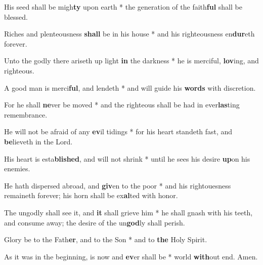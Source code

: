 \begin{multicols}{2}
	His seed shall be migh\textbf{ty} upon earth * the generation of the faith\textbf{ful} shall be blessed.
	
	Riches and plenteousness \textbf{shall} be in his house * and his righteousness en\textbf{dur}eth forever.
	
	Unto the godly there ariseth up light \textbf{in} the darkness * he is merciful, \textbf{lov}ing, and righteous.
	
	A good man is merci\textbf{ful}, and lendeth * and will guide his \textbf{words} with discretion.
	
	For he shall \textbf{ne}ver be moved * and the righteous shall be had in ever\textbf{las}ting remembrance.
	
	He will not be afraid of any \textbf{ev}il tidings * for his heart standeth fast, and \textbf{be}lieveth in the Lord.
	
	His heart is esta\textbf{blished}, and will not shrink * until he sees his desire \textbf{up}on his enemies.
	
	He hath dispersed abroad, and \textbf{giv}en to the poor * and his rightouesness remaineth forever; his horn shall be ex\textbf{al}ted with honor.
	
	The ungodly shall see it, and \textbf{it} shall grieve him * he shall gnash with his teeth, and consume away; the desire of the un\textbf{god}ly shall perish.
	
	Glory be to the Fath\textbf{er}, and to the Son * and to \textbf{the} Holy Spirit.
	
	As it was in the beginning, is now and \textbf{ev}er shall be * world \textbf{with}out end. Amen.
\end{multicols}